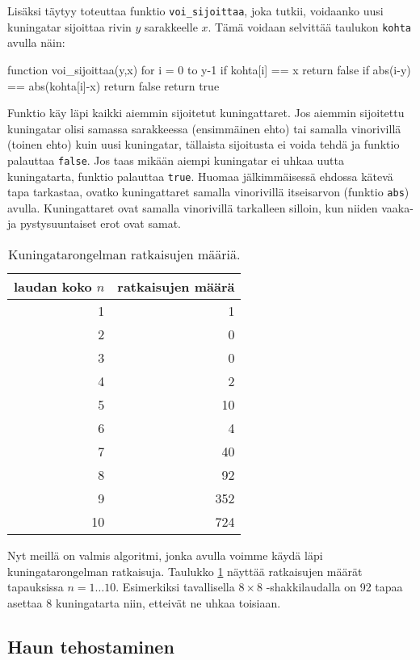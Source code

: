 Lisäksi täytyy toteuttaa funktio \texttt{voi\_sijoittaa},
joka tutkii, voidaanko uusi kuningatar sijoittaa
rivin $y$ sarakkeelle $x$.
Tämä voidaan selvittää taulukon \texttt{kohta} avulla näin:

\begin{code}
function voi_sijoittaa(y,x)
    for i = 0 to y-1
        if kohta[i] == x
            return false
        if abs(i-y) == abs(kohta[i]-x)
            return false
    return true
\end{code}

Funktio käy läpi kaikki aiemmin sijoitetut kuningattaret.
Jos aiemmin sijoitettu kuningatar olisi samassa sarakkeessa
(ensimmäinen ehto) tai samalla vinorivillä (toinen ehto)
kuin uusi kuningatar, tällaista sijoitusta ei voida tehdä
ja funktio palauttaa \texttt{false}.
Jos taas mikään aiempi kuningatar ei uhkaa uutta kuningatarta,
funktio palauttaa \texttt{true}.
Huomaa jälkimmäisessä ehdossa kätevä tapa tarkastaa,
ovatko kuningattaret samalla vinorivillä itseisarvon
(funktio \texttt{abs}) avulla.
Kuningattaret ovat samalla vinorivillä tarkalleen silloin,
kun niiden vaaka- ja pystysuuntaiset erot ovat samat.

\begin{table}
\center
\begin{tabular}{rr}
laudan koko $n$ & ratkaisujen määrä \\
\hline
1 & 1 \\
2 & 0 \\
3 & 0 \\
4 & 2 \\
5 & 10 \\
6 & 4 \\
7 & 40 \\
8 & 92 \\
9 & 352 \\
10 & 724 \\
\end{tabular}
\caption{Kuningatarongelman ratkaisujen määriä.}
\label{tab:kuning}
\end{table}

Nyt meillä on valmis algoritmi, jonka avulla voimme
käydä läpi kuningatarongelman ratkaisuja.
Taulukko \ref{tab:kuning} näyttää ratkaisujen määrät
tapauksissa $n=1 \dots 10$.
Esimerkiksi tavallisella $8 \times 8$ -shakkilaudalla
on 92 tapaa asettaa 8 kuningatarta niin,
etteivät ne uhkaa toisiaan.

\subsection{Haun tehostaminen}

